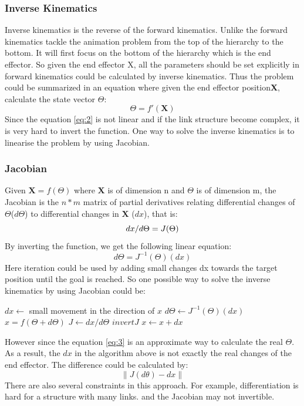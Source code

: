 \subsubsection{Inverse Kinematics}
Inverse kinematics is the reverse of the forward kinematics. Unlike the forward kinematics tackle the animation problem from the top of the hierarchy to the bottom. It will first focus on the bottom of the hierarchy which is the end effector. So given the end effector X, all the parameters should be set explicitly in forward kinematics could be calculated by inverse kinematics\cite{Reference2}. Thus the problem could be summarized in an equation where given the end effector position\textbf{X}, calculate the state vector $\Theta{}$\cite{alan3D}:
\begin{equation}
\label{eq:2}
\Theta{}= f'(\mathbf{X})    
\end{equation}
Since the equation \ref{eq:2} is not linear and if the link structure become complex, it is very hard to invert the function. One way to solve the inverse kinematics is to linearise the problem by using Jacobian.\cite{alan3D}
\subsubsection{Jacobian}
Given $\mathbf{X}= f(\Theta)$ where $\mathbf{X}$ is of dimension n and $\Theta{}$ is of dimension m, the
Jacobian is the $n * m$ matrix of partial derivatives relating
differential changes of $\Theta$($d\Theta{}$) to differential
changes in $\mathbf{X}$ ($dx$), that is\cite{alan3D}:\\
\begin{equation}
dx/d\Theta=J(\Theta)\\
\end{equation}
By inverting the function, we get the following linear equation\cite{alan3D}:
\begin{equation}
\label{eq:3}
d\Theta=J^{-1}(\Theta)(dx) 
\end{equation}
Here iteration could be used by adding small changes dx towards the target position until the goal is reached. 
So one possible way to solve the inverse kinematics by using Jacobian could be\cite{alan3D}:
\begin{algorithm}
\begin{algorithmic} 
\REPEAT 
\STATE $dx \leftarrow$ small movement in the direction of $x$
\STATE $d\Theta \leftarrow J^{-1}(\Theta)(dx)$
\STATE $x=f(\Theta+d\Theta)$
\STATE $J \leftarrow dx/d\Theta$
\STATE $invert J$
\STATE $x \leftarrow x+dx$
\end{algorithmic}
\end{algorithm}
However since the equation \ref{eq:3} is an approximate way to calculate the real $\Theta$. As a result, the $dx$ in the algorithm above is not exactly the real changes of the end effector. The difference could be calculated by:
\begin{equation}
\|J(d\theta)-dx\|
\end{equation}
There are also several constraints in this approach. For example, differentiation is hard for a structure with many links. and the Jacobian may not invertible\cite{alan3D}.
